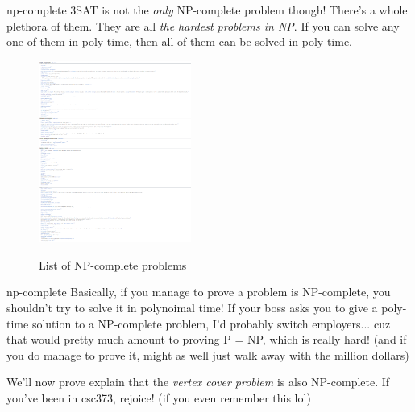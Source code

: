 \documentclass{beamer}
\begin{document}
\begin{frame}{np-complete}
3SAT is not the \textit{only} NP-complete problem though! There's a whole plethora of them. They are all \textit{the hardest problems in NP}. If you can solve any one of them in poly-time, then all of them can be solved in poly-time.

\begin{figure}[h]
\centering
\includegraphics[width=5cm]{img/np-complete.png}

List of NP-complete problems
\end{figure}

\end{frame}

\begin{frame}{np-complete}
Basically, if you manage to prove a problem is NP-complete, you shouldn't try to solve it in polynoimal time! If your boss asks you to give a poly-time solution to a NP-complete problem, I'd probably switch employers... cuz that would pretty much amount to proving P = NP, which is really hard! (and if you do manage to prove it, might as well just walk away with the million dollars)

\vspace{2mm}

We'll now prove explain that the \textit{vertex cover problem} is also NP-complete. If you've been in csc373, rejoice! (if you even remember this lol)
\end{frame}
\end{document}
